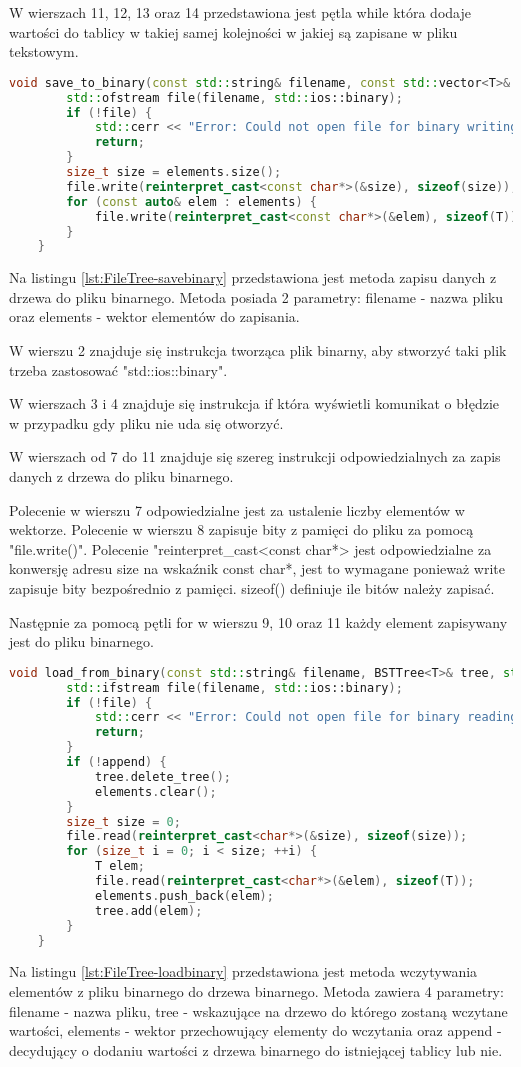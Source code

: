 W wierszach 11, 12, 13 oraz 14 przedstawiona jest pętla while która dodaje wartości do tablicy w takiej samej kolejności w jakiej są zapisane w pliku tekstowym.

\begin{lstlisting}[caption=Metoda \texttt{save\_to\_binary}, label={lst:FileTree-savebinary}, language=C++]
	void save_to_binary(const std::string& filename, const std::vector<T>& elements) {
		std::ofstream file(filename, std::ios::binary);
		if (!file) {
			std::cerr << "Error: Could not open file for binary writing.\n";
			return;
		}
		size_t size = elements.size();
		file.write(reinterpret_cast<const char*>(&size), sizeof(size));
		for (const auto& elem : elements) {
			file.write(reinterpret_cast<const char*>(&elem), sizeof(T));
		}
	}
\end{lstlisting}
Na listingu \ref{lst:FileTree-savebinary} przedstawiona jest metoda zapisu danych z drzewa do pliku binarnego. Metoda posiada 2 parametry: filename - nazwa pliku oraz elements - wektor elementów do zapisania.

W wierszu 2 znajduje się instrukcja tworząca plik binarny, aby stworzyć taki plik trzeba zastosować "std::ios::binary".

W wierszach 3 i 4 znajduje się instrukcja if która wyświetli komunikat o błędzie w przypadku gdy pliku nie uda się otworzyć.

W wierszach od 7 do 11 znajduje się szereg instrukcji odpowiedzialnych za zapis danych z drzewa do pliku binarnego.

Polecenie w wierszu 7 odpowiedzialne jest za ustalenie liczby elementów w wektorze.
Polecenie w wierszu 8 zapisuje bity z pamięci do pliku za pomocą "file.write()". Polecenie "reinterpret\_cast<const char*> jest odpowiedzialne za konwersję adresu size na wskaźnik const char*, jest to wymagane ponieważ write zapisuje bity bezpośrednio z pamięci. sizeof() definiuje ile bitów należy zapisać.

Następnie za pomocą pętli for w wierszu 9, 10 oraz 11 każdy element zapisywany jest do pliku binarnego.

\begin{lstlisting}[caption=Metoda \texttt{load\_to\_binary}, label={lst:FileTree-loadbinary}, language=C++]
	void load_from_binary(const std::string& filename, BSTTree<T>& tree, std::vector<T>& elements, bool append = false) {
		std::ifstream file(filename, std::ios::binary);
		if (!file) {
			std::cerr << "Error: Could not open file for binary reading.\n";
			return;
		}
		if (!append) {
			tree.delete_tree();
			elements.clear();
		}
		size_t size = 0;
		file.read(reinterpret_cast<char*>(&size), sizeof(size));
		for (size_t i = 0; i < size; ++i) {
			T elem;
			file.read(reinterpret_cast<char*>(&elem), sizeof(T));
			elements.push_back(elem);
			tree.add(elem);
		}
	}
\end{lstlisting}
Na listingu \ref{lst:FileTree-loadbinary} przedstawiona jest metoda wczytywania elementów z pliku binarnego do drzewa binarnego.
Metoda zawiera 4 parametry: filename - nazwa pliku, tree - wskazujące na drzewo do którego zostaną wczytane wartości, elements - wektor przechowujący elementy do wczytania oraz append - decydujący o dodaniu wartości z drzewa binarnego do istniejącej tablicy lub nie.

